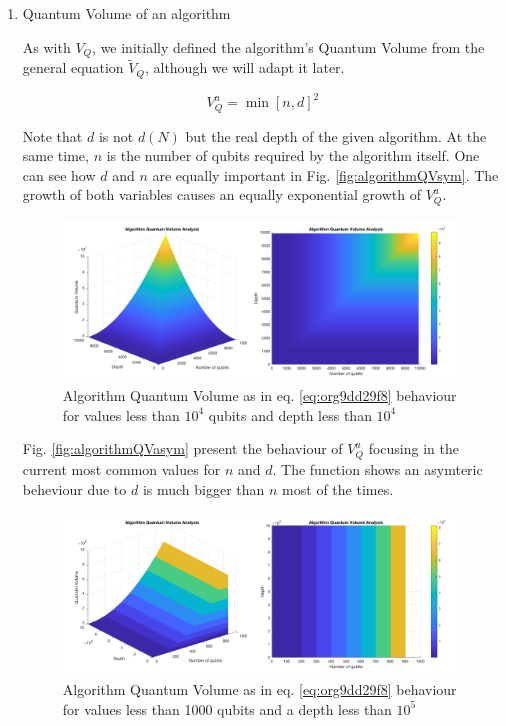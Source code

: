 \begin{enumerate}
\begin{enumerate}
\begin{enumerate}
\item Quantum Volume of an algorithm
\label{sec:orgbf89e15}

As with \(V_Q\), we initially defined the algorithm's Quantum Volume from the general equation \(\tilde{V}_Q\), although we will adapt it later.

\begin{equation}
\label{eq:org9dd29f8}
V_Q^a = \min \left[ n,d \right]^2
\end{equation}

Note that \(d\) is not \(d(N)\) but the real depth of the given algorithm.
At the same time, \(n\) is the number of qubits required by the algorithm itself.
One can see how \(d\) and \(n\) are equally important in Fig. \ref{fig:algorithmQVsym}.
The growth of both variables causes an equally exponential growth of \(V^a_Q\).

\begin{figure}[htbp]
\centering
\includegraphics[width=\textwidth]{figures/V_q_analysis_sym.png}
\caption{\label{fig:org3614856}
Algorithm Quantum Volume as in eq. \ref{eq:org9dd29f8} behaviour for values less than \(10^{4}\) qubits and depth less than \(10^{4}\)}
\end{figure}

Fig. \ref{fig:algorithmQVasym} present the behaviour of \(V_Q^a\)
focusing in the current most common values for \(n\) and \(d\).
The function shows an asymteric beheviour due to \(d\) is much bigger than \(n\) most of the times.


\begin{figure}[htbp]
\centering
\includegraphics[width=\textwidth]{figures/V_q_analysis_asym.png}
\caption{\label{fig:org150cd5d}
Algorithm Quantum Volume as in eq. \ref{eq:org9dd29f8} behaviour for values less than 1000 qubits and a depth less than \(10^{5}\)}
\end{figure}


\end{enumerate}
\end{enumerate}
\end{enumerate}
